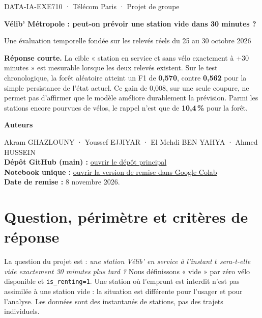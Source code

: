 \documentclass[11pt,a4paper]{article}
\newcommand{\callout}[1]{\noindent\colorbox{pale}{\parbox{\dimexpr\linewidth-2\fboxsep\relax}{\vspace{0.4em}#1\vspace{0.4em}}}}
\begin{document}
\thispagestyle{empty}
\vspace*{19mm}
{\sffamily\large\color{turquoise} DATA-IA-EXE710 · Télécom Paris · Projet de groupe\par}
\vspace{6mm}
{\sffamily\bfseries\fontsize{25}{31}\selectfont\color{bleu} Vélib' Métropole : peut-on prévoir une station vide dans 30 minutes ?\par}
\vspace{7mm}
{\Large Une évaluation temporelle fondée sur les relevés réels du 25 au 30 octobre 2026\par}
\vspace{12mm}
\callout{\textbf{Réponse courte.} La cible « station en service et sans vélo exactement à +30 minutes » est mesurable lorsque les deux relevés existent. Sur le test chronologique, la forêt aléatoire atteint un F1 de \textbf{0,570}, contre \textbf{0,562} pour la simple persistance de l'état actuel. Ce gain de 0,008, sur une seule coupure, ne permet pas d'affirmer que le modèle améliore durablement la prévision. Parmi les stations encore pourvues de vélos, le rappel n'est que de \textbf{10,4\,\%} pour la forêt.}
\vfill
{\sffamily\bfseries Auteurs\par}
Akram GHAZLOUNY · Youssef EJJIYAR · El Mehdi BEN YAHYA · Ahmed HUSSEIN\\
\vspace{4mm}
\textbf{Dépôt GitHub (main) :} \href{https://github.com/G-Akram01/velib-kit-data-science}{ouvrir le dépôt principal}\\
\textbf{Notebook unique :} \href{https://colab.research.google.com/github/G-Akram01/velib-kit-data-science/blob/main/notebooks/01_analyse_finale_velib.ipynb}{ouvrir la version de remise dans Google Colab}\\
\textbf{Date de remise :} 8 novembre 2026.
\newpage

\section{Question, périmètre et critères de réponse}

La question du projet est : \emph{une station Vélib' en service à l'instant $t$ sera-t-elle vide exactement 30 minutes plus tard ?} Nous définissons « vide » par zéro vélo disponible et \texttt{is\_renting=1}. Une station où l'emprunt est interdit n'est pas assimilée à une station vide : la situation est différente pour l'usager et pour l'analyse. Les données sont des instantanés de stations, pas des trajets individuels.
\end{document}
